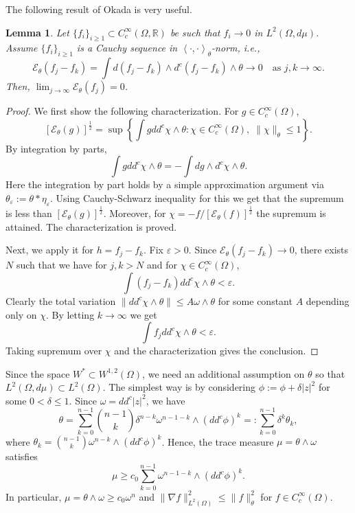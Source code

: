 \documentclass{amsart}
\newcommand{\lc}{\left<}
\newcommand{\rc}{\right>}
\newcommand{\veps}{\varepsilon}
\newcommand{\de}{\delta}
\newcommand{\om}{\omega}
\newcommand{\te}{\theta}
\newcommand{\Om}{\Omega}
\newcommand{\na}{\nabla}
\newcommand{\bR}{\mathbb{R}}
\newcommand{\cali}[1]{\mathscr{#1}}
\newcommand{\Ec}{\cali{E}}
\newtheorem{lem}[thm]{Lemma}
\theoremstyle{definition}
\numberwithin{thm}{section}
\numberwithin{equation}{section}
\renewcommand{\[}{\begin{equation}}
\renewcommand{\]}{\end{equation}}
\newcommand{\wed}{\wedge}
\begin{document}
The following result of Okada \cite{Okada82} is very useful. 
 
\begin{lem} \label{lem:O} Let $\{f_i\}_{i\geq 1} \subset C^\infty_c(\Om,\bR)$ be such that $f_i \to 0$ in $L^2(\Om, d\mu)$. Assume $\{f_i\}_{i\geq 1}$ is a Cauchy sequence in $\lc \cdot, \cdot \rc_\te$-norm, i.e.,
\[\label{eq:Cauchy-seq}
 \Ec_\te( f_j - f_k) =\int d(f_j -f_k) \wed d^c (f_j-f_k) \wed \te \to 0 \quad\text{as } j,k \to \infty.
\]
Then, $\lim_{j\to \infty} \Ec_\te(f_j) =0$.
\end{lem}

\begin{proof} We first show the following characterization.  For $g\in C^\infty_c(\Om)$,
$$
	[\Ec_\te(g)]^\frac{1}{2} = \sup \left\{  \int g dd^c \chi \wed \te : \chi \in C^\infty_c(\Om), \; \| \chi\|_\te \leq 1 \right\}.
$$
By integration by parts,
$$
	\int g dd^c \chi \wed \te = - \int dg \wed d^c \chi \wed \te.
$$
Here the integration by part holds by a simple approximation argument via $\te_\veps := \te *\eta_\veps$. Using Cauchy-Schwarz inequality for this we get that the supremum is  less than $[\Ec_\te(g)]^\frac{1}{2}$.  Moreover, for $\chi = -f/ [\Ec_\te(f)]^\frac{1}{2}$ the supremum is attained. The characterization is proved. 

Next, we  apply it for $h= f_j - f_k$.  Fix $\veps>0$. 
Since $\Ec_\te (f_j-f_k) \to 0$, there exists $N$ such that we have  for $j,k>N$ and for $\chi \in C^\infty_c(\Om)$,
$$
	\int (f_j -f_k) dd^c\chi \wed \te < \veps.
$$
Clearly the total variation $\| dd^c \chi \wed \te \| \leq A  \om \wed \te$ for some constant $A$ depending only on $\chi$. By letting $k\to \infty$ we get 
$$
	\int f_j dd^c\chi \wed\te <\veps.
$$
Taking supremum over $\chi$ and the characterization gives the conclusion.
\end{proof}

Since the space $W^*\subset W^{1,2}(\Om)$, we need an additional assumption on $\te$ so that $L^2(\Om, d\mu) \subset L^2(\Om)$. The simplest way is by considering $\phi := \phi + \de |z|^2$ for some $0< \de \leq 1$. Since $\om = dd^c|z|^2$, we have
\[\label{eq:add}
	\te  = \sum_{k=0}^{n-1} \binom{n-1}{k} \de^{n-k} \om^{n-1-k} \wed (dd^c\phi)^{k}  =: \sum_{k=0}^{n-1} \de^k \te_k,
\]
where $\te_k =  \binom{n-1}{k} \om^{n-k}\wed (dd^c\phi)^{k}$.
Hence, the trace measure  $\mu=\te\wed \om$ satisfies
\[\label{eq:trace-m}
	 \mu \geq c_0 \sum_{k=0}^{n-1} \om^{n-1-k}\wed (dd^c\phi)^k.
\]
In particular, $\mu = \te \wed \om \geq c_0 \om^n$ and 
$
	\|\na f\|_{L^2(\Om)}^2 \leq  \|f\|_\te^2 
$
for  $f\in C^\infty_c(\Om).$
\end{document}

